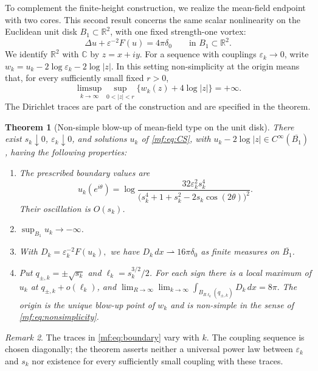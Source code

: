 \documentclass[11pt,reqno]{amsart}
\numberwithin{equation}{section}
\newtheorem{theorem}{Theorem}[section]
\theoremstyle{definition}
\theoremstyle{remark}
\newtheorem{remark}[theorem]{Remark}
\newcommand{\R}{\mathbb R}
\newcommand{\eps}{\varepsilon}
\newcommand{\C}{\mathbb C}
\newcommand{\dd}{\,dx}
\begin{document}
To complement the finite-height construction, we realize the mean-field
endpoint with two cores. This second result concerns the same scalar
nonlinearity on the
Euclidean unit disk \(B_1\subset\R^2\), with one fixed strength-one vortex:
\begin{equation}\label{mf:eq:CS}
\Delta u+\eps^{-2}F(u)=4\pi\delta_0
\qquad\text{in }B_1\subset\R^2.
\end{equation}
We identify \(\R^2\) with \(\C\) by \(z=x+iy\). For a sequence with couplings
\(\eps_k\to0\), write
\(w_k=u_k-2\log\eps_k-2\log|z|.\)
In this setting non-simplicity at the origin means that, for every
sufficiently small fixed $r>0$,
\begin{equation}\label{mf:eq:nonsimplicity}
 \limsup_{k\to\infty}\sup_{0<|z|<r}
       \{w_k(z)+4\log|z|\}=+\infty.
\end{equation}
The Dirichlet traces are part of the construction and are specified
in the theorem.
\begin{theorem}[Non-simple blow-up of mean-field type on the unit disk]\label{mf:thm:main}
There exist $s_k\downarrow0$, $\eps_k\downarrow0$, and solutions $u_k$
of \eqref{mf:eq:CS}, with $u_k-2\log|z|\in C^\infty(\overline{B_1})$,
having the following properties:
\begin{enumerate}
\item The prescribed boundary values are
\begin{equation}\label{mf:eq:boundary}
u_k(e^{i\theta})=
\log\frac{32\eps_k^2s_k^4}
{\bigl(s_k^4+1+s_k^2-2s_k\cos(2\theta)\bigr)^2}.
\end{equation}
Their oscillation is $O(s_k)$.
\item $\sup_{B_1}u_k\to-\infty$.
\item With
\(
D_k=\eps_k^{-2}F(u_k),
\)
we have $D_k\dd\rightharpoonup16\pi\delta_0$ as finite measures
on $\overline{B_1}$.
\item Put $q_{\pm,k}=\pm\sqrt{s_k}$ and $\ell_k=s_k^{3/2}/2$.
For each sign there is a local maximum of $u_k$ at
$q_{\pm,k}+o(\ell_k)$, and
$
\lim_{R\to\infty}\lim_{k\to\infty}
\int_{B_{R\ell_k}(q_{\pm,k})}D_k\dd=8\pi.
$
The origin is the unique blow-up point of $w_k$ and is non-simple
in the sense of \eqref{mf:eq:nonsimplicity}.
\end{enumerate}
\end{theorem}

\begin{remark}\label{mf:rem:scope}
The traces in \eqref{mf:eq:boundary} vary with $k$.
The coupling sequence is chosen diagonally; the theorem asserts neither
a universal power law between $\eps_k$ and $s_k$ nor existence for every
sufficiently small coupling with these traces.
\end{remark}
\end{document}
